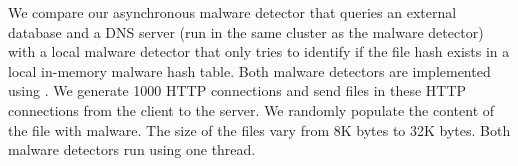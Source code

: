\begin{table}[!h]
\centering
\caption{Performance of Malware Detectors}
\label{table:stat}
\vspace{-5mm}
\end{table}

We compare our asynchronous malware detector that queries an external database and a DNS server (run in the same cluster as the malware detector) with a local malware detector that only tries to identify if the file hash exists in a local in-memory malware hash table. Both malware detectors are implemented using \netstar.
We generate 1000 HTTP connections and send files in these HTTP connections from the client to the server. We randomly populate the content of the file with malware. The size of the files vary from 8K bytes to 32K bytes. Both malware detectors run using one thread.%

